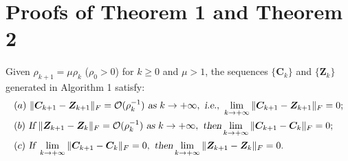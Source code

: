 \section{Proofs of Theorem 1 and Theorem 2}
\begin{theorem}
\label{th1}
Given $\rho_{k+1}=\mu\rho_{k}$ ($\rho_{0}>0$) for $k\ge0$ and $\mu>1$, the sequences $\{\bm{C}_{k}\}$ and $\{\bm{Z}_{k}\}$ generated in Algorithm 1 satisfy:
\begin{align}
&
(a)\ 
\|\bm{C}_{k+1}-\bm{Z}_{k+1}\|_{F}=\mathcal{O}(\rho_{k}^{-1})
\ 
\textsl{as}\ k \to +\infty
,\ 
\textsl{i.e.},\ 
\lim_{k \to +\infty} \|\bm{C}_{k+1}-\bm{Z}_{k+1}\|_{F}=0;
\\
&
(b)\ 
\textsl{If}\ 
\|\bm{Z}_{k+1}-\bm{Z}_{k}\|_{F}=\mathcal{O}(\rho_{k}^{-1})
\ 
\textsl{as}\ k \to +\infty
,\ 
\textsl{then} 
\lim_{k \to +\infty} \|\bm{C}_{k+1}-\bm{C}_{k}\|_{F}=0;
\\
&
(c)\ 
\textsl{If}\ 
\lim_{k \to +\infty} \|\bm{C}_{k+1}-\bm{C}_{k}\|_{F}=0,\ 
\textsl{then} 
\lim_{k \to +\infty} \|\bm{Z}_{k+1}-\bm{Z}_{k}\|_{F}=0.
\end{align}
\end{theorem}

